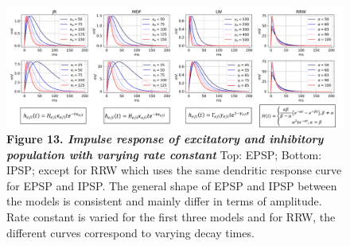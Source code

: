 \documentclass[12pt,twoside]{article}
\begin{document}
\begin{figure}[H]
    \hspace{-0.5cm}
    \includegraphics[scale=0.3]{Images/Impulse_response_3_1.png}
    \caption*{\textbf{Figure 13.  \textit{Impulse response of excitatory and inhibitory population with varying rate constant}} Top: EPSP; Bottom: IPSP; except for RRW which uses the same dendritic response curve for EPSP and IPSP. The general shape of EPSP and IPSP between the models is consistent and mainly differ in terms of amplitude. Rate constant is varied for the first three models and for RRW, the different curves correspond to varying decay times. }     
    \label{fig:JR_impulse}
\end{figure}
\vspace{-1cm}
\end{document}
